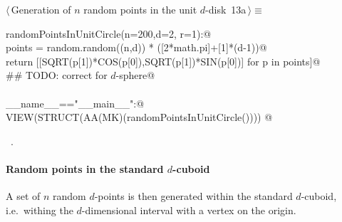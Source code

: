 \documentclass[11pt,oneside]{article}	%
\begin{document}
\begin{flushleft} \small \label{scrap19}
\protect{}$\langle\,$Generation of $n$ random points in the unit $d$-disk\nobreak\ {\footnotesize 13a}$\,\rangle\equiv$
\vspace{-1ex}
\begin{list}{}{} \item
\mbox{}\verb@def randomPointsInUnitCircle(n=200,d=2, r=1):@\\
\mbox{}\verb@   points = random.random((n,d)) * ([2*math.pi]+[1]*(d-1))@\\
\mbox{}\verb@   return [[SQRT(p[1])*COS(p[0]),SQRT(p[1])*SIN(p[0])] for p in points]@\\
\mbox{}\verb@   ## TODO: correct for $d$-sphere@\\
\mbox{}\verb@@\\
\mbox{}\verb@if __name__=="__main__":@\\
\mbox{}\verb@   VIEW(STRUCT(AA(MK)(randomPointsInUnitCircle()))) @\\
\mbox{}\verb@@{\NWsep}
\end{list}
\vspace{-1ex}
\footnotesize\addtolength{\baselineskip}{-1ex}
\begin{list}{}{\setlength{\itemsep}{-\parsep}\setlength{\itemindent}{-\leftmargin}}
\item \NWtxtMacroRefIn\ .
\end{list}
\end{flushleft}

\paragraph{Random points in the standard $d$-cuboid} 
A set of $n$ random $d$-points is then generated within the standard $d$-cuboid, i.e.~withing the $d$-dimensional interval with a vertex on the origin.
\end{document}
